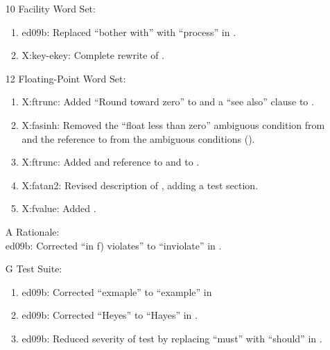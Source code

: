 \begin{itemize}
	\item[10] Facility Word Set:
		\begin{enumerate}
		\item \textsf{ed09b}: Replaced ``bother with'' with
			``process'' in .
		\item \textsf{X:key-ekey}: Complete rewrite of
			.
		\end{enumerate}

	\item[12] Floating-Point Word Set:
		\begin{enumerate}
		\item \textsf{X:ftrunc}: Added ``Round toward zero'' to 
			and a ``see also'' clause to .
		\item \textsf{X:fasinh}: Removed the ``float less than zero'' ambiguous
			condition from  and the reference to
			 from the ambiguous conditions
			().
		\item \textsf{X:ftrunc}: Added and reference to
			 and to .
		\item \textsf{X:fatan2}: Revised description of
			, adding a test section.
		\item \textsf{X:fvalue}: Added .
		\end{enumerate}

	\item[A] Rationale: \\
		\textsf{ed09b:} Corrected ``in f) violates'' to ``inviolate'' in
		.

	\item[G] Test Suite:
		\begin{enumerate}
		\item \textsf{ed09b}: Corrected ``exmaple'' to ``example'' in
		\item \textsf{ed09b}: Corrected ``Heyes'' to ``Hayes''
			in .
		\item \textsf{ed09b}: Reduced severity of test by replacing
			``must'' with ``should'' in .
		\end{enumerate}
	\end{itemize}


